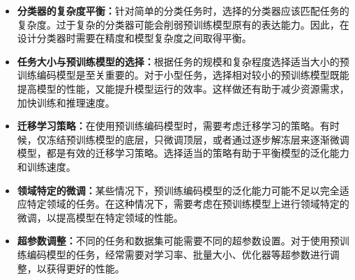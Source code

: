 \begin{itemize}
	\item \textbf{分类器的复杂度平衡：}针对简单的分类任务时，选择的分类器应该匹配任务的复杂度。过于复杂的分类器可能会削弱预训练模型原有的表达能力。因此，在设计分类器时需要在精度和模型复杂度之间取得平衡。
	\item \textbf{任务大小与预训练模型的选择：}根据任务的规模和复杂程度选择适当大小的预训练编码模型是至关重要的。对于小型任务，选择相对较小的预训练模型既能提高模型的性能，又能提升模型运行的效率。这样做还有助于减少资源需求，加快训练和推理速度。
	\item \textbf{迁移学习策略：}在使用预训练编码模型时，需要考虑迁移学习的策略。有时候，仅冻结预训练模型的底层，只微调顶层，或者通过逐步解冻层来逐渐微调模型，都是有效的迁移学习策略。选择适当的策略有助于平衡模型的泛化能力和训练速度。
	\item \textbf{领域特定的微调：}某些情况下，预训练编码模型的泛化能力可能不足以完全适应特定领域的任务。在这种情况下，需要考虑在预训练模型上进行领域特定的微调，以提高模型在特定领域的性能。
	\item \textbf{超参数调整：}不同的任务和数据集可能需要不同的超参数设置。对于使用预训练编码模型的任务，经常需要对学习率、批量大小、优化器等超参数进行调整，以获得更好的性能。
\end{itemize}


















































































